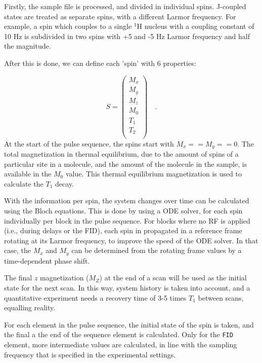 \documentclass[11pt,a4paper]{article}
\begin{document}
Firstly, the sample file is processed, and divided in individual spins. J-coupled states are treated as separate spins, with a different Larmor frequency. For example, a spin which couples to a single $^1$H nucleus with a coupling constant of 10 Hz is subdivided in two spins with +5 and -5 Hz Larmor frequency and half the magnitude.

After this is done, we can define each 'spin' with 6 properties:

\begin{equation}
  S = \left( \begin{array}{c}
M_x \\
M_y \\
M_z \\
M_0 \\
T_1 \\
T_2\\
  \end{array} \right) \quad .
\end{equation}
At the start of the pulse sequence, the spins start with $M_x == M_y == 0$.
The total magnetization in thermal equilibrium, due to the amount of spins of a particular site in a molecule, and the amount of the molecule in the sample, is available in the $M_0$ value.
This thermal equilibrium magnetization is used to calculate the $T_1$ decay.

With the information per spin, the system changes over time can be calculated using the Bloch equations.
This is done by using a ODE solver, for each spin individually per block in the pulse sequence.
For blocks where no RF is applied (i.e., during delays or the FID), each spin in propagated in a reference frame rotating at its Larmor frequency, to improve the speed of the ODE solver.
In that case, the $M_x$ and $M_y$ can be determined from the rotating frame values by a time-dependent phase shift.

The final $z$ magnetization ($M_Z$) at the end of a scan will be used as the initial state for the next scan.
In this way, system history is taken into account, and a quantitative experiment needs a recovery time of 3-5 times $T_1$ between scans, equalling reality.

For each element in the pulse sequence, the initial state of the spin is taken, and the final a the end of the sequence element is calculated.
Only for the \texttt{FID} element, more intermediate values are calculated, in line with the sampling frequency that is specified in the experimental settings.
\end{document}
